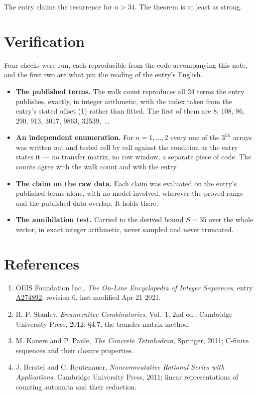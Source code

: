 \documentclass[11pt]{article}
\theoremstyle{definition}
\begin{document}
The entry claims the recurrence for $n > 34$. The theorem is at least as strong.

\section{Verification}

Four checks were run, each reproducible from the code accompanying this note, and the first two are what pin the reading of the entry's English.

\begin{itemize}

\item {\bfseries The published terms.} The walk count reproduces all 24 terms the entry publishes, exactly, in integer arithmetic, with the index taken from the entry's stated offset (1) rather than fitted. The first of them are 8, 108, 86, 290, 913, 3017, 9863, 32539,~\dots

\item {\bfseries An independent enumeration.} For $n = 1,\dots,2$ every one of the $3^{5n}$ arrays was written out and tested cell by cell against the condition as the entry states it --- no transfer matrix, no row window, a separate piece of code. The counts agree with the walk count and with the entry.

\item {\bfseries The claim on the raw data.} Each claim was evaluated on the entry's published terms alone, with no model involved, wherever the proved range and the published data overlap. It holds there.

\item {\bfseries The annihilation test.} Carried to the derived bound $S = 35$ over the whole vector, in exact integer arithmetic, never sampled and never truncated.

\end{itemize}

\section{References}

\begin{enumerate}

\item OEIS Foundation Inc., \emph{The On-Line Encyclopedia of Integer Sequences}, entry \href{https://oeis.org/A274892}{A274892}, revision 6, last modified Apr 21 2021.

\item R. P. Stanley, \emph{Enumerative Combinatorics}, Vol.~1, 2nd ed., Cambridge University Press, 2012; \S4.7, the transfer-matrix method.

\item M. Kauers and P. Paule, \emph{The Concrete Tetrahedron}, Springer, 2011; C-finite sequences and their closure properties.

\item J. Berstel and C. Reutenauer, \emph{Noncommutative Rational Series with Applications}, Cambridge University Press, 2011; linear representations of counting automata and their reduction.

\end{enumerate}
\end{document}
